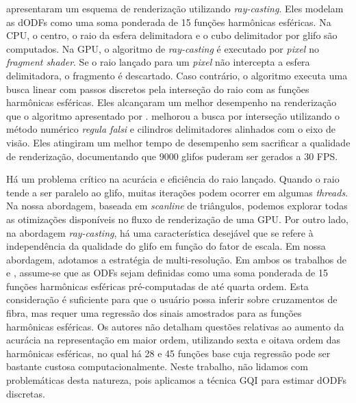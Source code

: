 

 apresentaram um esquema de renderização utilizando \textit{ray-casting}. Eles modelam as dODFs como uma soma ponderada de 15 funções harmônicas esféricas. Na CPU, o centro, o raio da esfera delimitadora e o cubo delimitador por glifo são computados. Na GPU, o algoritmo de \textit{ray-casting} é executado por \textit{pixel} no \textit{fragment shader}. Se o raio lançado para um \textit{pixel} não intercepta a esfera delimitadora, o fragmento é descartado. Caso contrário, o algoritmo executa uma busca linear com passos discretos pela interseção do raio com as funções harmônicas esféricas. Eles alcançaram um melhor desempenho na renderização que o algoritmo apresentado por .  melhorou a busca por interseção utilizando o método numérico \textit{regula falsi} e cilindros delimitadores alinhados com o eixo de visão. Eles atingiram um melhor tempo de desempenho sem sacrificar a qualidade de renderização, documentando que 9000 glifos puderam ser gerados a 30 FPS. 

Há um problema crítico na acurácia e eficiência do raio lançado. Quando o raio tende a ser paralelo ao glifo, muitas iterações podem ocorrer em algumas \textit{threads}. Na nossa abordagem, baseada em \textit{scanline} de triângulos, podemos explorar todas as otimizações disponíveis no fluxo de renderização de uma GPU. Por outro lado,
na abordagem \textit{ray-casting}, há uma característica desejável que se refere à independência da qualidade do glifo em função do fator de escala. Em nossa abordagem, adotamos a estratégia de multi-resolução.
Em ambos os trabalhos de  e , assume-se que as ODFs sejam definidas como uma soma ponderada de 15 funções harmônicas esféricas pré-computadas de até quarta ordem. Esta consideração é suficiente para que o usuário possa inferir sobre cruzamentos de fibra, mas requer uma regressão dos sinais amostrados para as funções harmônicas esféricas. Os autores não detalham questões relativas ao aumento da acurácia na representação em maior ordem, utilizando sexta e oitava ordem das harmônicas esféricas, no qual há 28 e 45 funções base \cite{descoteaux2007_QBI} cuja regressão pode ser bastante custosa computacionalmente. Neste trabalho, não lidamos com problemáticas desta natureza, pois aplicamos a técnica GQI para estimar dODFs discretas.


